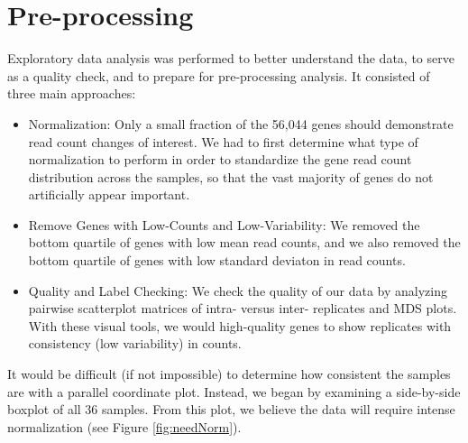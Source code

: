 \documentclass[11pt,a4paper,oldfontcommands,openany]{memoir}
\numberwithin{equation}{section} %
\begin{document}
\section{Pre-processing}

Exploratory data analysis was performed to better understand the data, to serve as a quality check, and to prepare for pre-processing analysis. It consisted of three main approaches:

\begin{itemize}

\item Normalization: Only a small fraction of the 56,044 genes should demonstrate read count changes of interest. We had to first determine what type of normalization to perform in order to standardize the gene read count distribution across the samples, so that the vast majority of genes do not artificially appear important.

\item Remove Genes with Low-Counts and Low-Variability: We removed the bottom quartile of genes with low mean read counts, and we also removed the bottom quartile of genes with low standard deviaton in read counts.

\item Quality and Label Checking: We check the quality of our data by analyzing pairwise scatterplot matrices of intra- versus inter- replicates and MDS plots. With these visual tools, we would high-quality genes to show replicates with consistency (low variability) in counts.

\end{itemize}

It would be difficult (if not impossible) to determine how consistent the samples are with a parallel coordinate plot. Instead, we began by examining a side-by-side boxplot of all 36 samples. From this plot, we believe the data will require intense normalization (see Figure \ref{fig:needNorm}).
\end{document}
